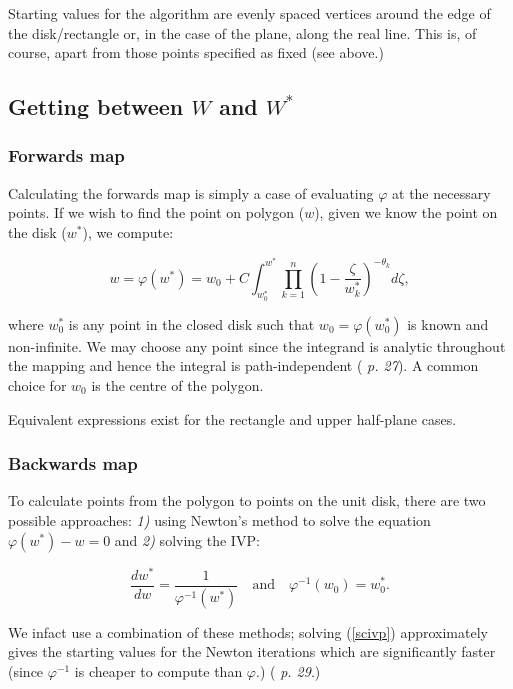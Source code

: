 \documentclass[a4paper,10pt]{amsart}
\newcommand{\phiinv}{\phi^{-1}}
\renewcommand{\phi}{\varphi}
\begin{document}
Starting values for the algorithm are evenly spaced vertices around the edge of the disk/rectangle or, in the case of the plane, along the real line. This is, of course, apart from those points specified as fixed (see above.)

\subsection{Getting between $W$ and $W^*$}

\subsubsection{Forwards map}

Calculating the forwards map is simply a case of evaluating $\phi$ at the necessary points. If we wish to find the point on polygon ($w$), given we know the point on the disk ($w^*$), we compute:

\begin{equation}
\label{forwardsmap}
w=\phi(w^*) = w_0 + C \int_{w^*_0}^{w^*} \prod_{k=1}^{n} (1 - \frac{\zeta}{w^*_k})^{-\theta_k} d\zeta,
\end{equation}

where $w^*_0$ is any point in the closed disk such that $w_0 = \phi(w^*_0)$ is known and non-infinite. We may choose any point since the integrand is analytic throughout the mapping and hence the integral is path-independent (\cite{driscoll} \emph{p. 27}). A common choice for $w_0$ is the centre of the polygon.

Equivalent expressions exist for the rectangle and upper half-plane cases.


\subsubsection{Backwards map}

To calculate points from the polygon to points on the unit disk, there are two possible approaches: \emph{1)} using Newton's method to solve the equation $\phi(w^*)-w=0$ and \emph{2)} solving the IVP:

\begin{equation}
\label{scivp}
\frac{dw^*}{dw}=\frac{1}{\phi^{-1}(w^*)} \quad \text{and} \quad \phiinv(w_0)=w^*_0.
\end{equation}

We infact use a combination of these methods; solving (\ref{scivp}) approximately gives the starting values for the Newton iterations which are significantly faster (since $\phi^{-1}$ is cheaper to compute than $\phi$.) (\cite{driscoll} \emph{p. 29}.)
\end{document}
